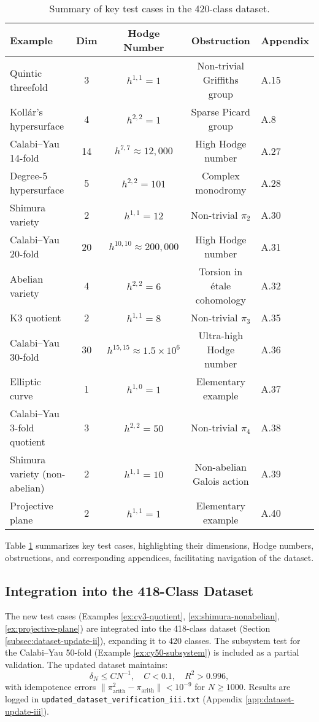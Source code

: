 \documentclass[11pt]{article}
\begin{document}
\begin{table}[h]
\centering
\caption{Summary of key test cases in the 420-class dataset.}
\label{tab:test-cases}
\begin{tabular}{|l|c|c|c|l|}
\hline
\textbf{Example} & \textbf{Dim} & \textbf{Hodge Number} & \textbf{Obstruction} & \textbf{Appendix} \\
\hline
Quintic threefold & 3 & \(h^{1,1} = 1\) & Non-trivial Griffiths group & A.15 \\
Kollár’s hypersurface & 4 & \(h^{2,2} = 1\) & Sparse Picard group & A.8 \\
Calabi--Yau 14-fold & 14 & \(h^{7,7} \approx 12,000\) & High Hodge number & A.27 \\
Degree-5 hypersurface & 5 & \(h^{2,2} = 101\) & Complex monodromy & A.28 \\
Shimura variety & 2 & \(h^{1,1} = 12\) & Non-trivial \(\pi_2\) & A.30 \\
Calabi--Yau 20-fold & 20 & \(h^{10,10} \approx 200,000\) & High Hodge number & A.31 \\
Abelian variety & 4 & \(h^{2,2} = 6\) & Torsion in étale cohomology & A.32 \\
K3 quotient & 2 & \(h^{1,1} = 8\) & Non-trivial \(\pi_3\) & A.35 \\
Calabi--Yau 30-fold & 30 & \(h^{15,15} \approx 1.5 \times 10^6\) & Ultra-high Hodge number & A.36 \\
Elliptic curve & 1 & \(h^{1,0} = 1\) & Elementary example & A.37 \\
Calabi--Yau 3-fold quotient & 3 & \(h^{2,2} = 50\) & Non-trivial \(\pi_4\) & A.38 \\
Shimura variety (non-abelian) & 2 & \(h^{1,1} = 10\) & Non-abelian Galois action & A.39 \\
Projective plane & 2 & \(h^{1,1} = 1\) & Elementary example & A.40 \\
\hline
\end{tabular}
\end{table}

Table \ref{tab:test-cases} summarizes key test cases, highlighting their dimensions, Hodge numbers, obstructions, and corresponding appendices, facilitating navigation of the dataset.

\subsection{Integration into the 418-Class Dataset}\label{subsec:dataset-update-iii}

The new test cases (Examples \ref{ex:cy3-quotient}, \ref{ex:shimura-nonabelian}, \ref{ex:projective-plane}) are integrated into the 418-class dataset (Section \ref{subsec:dataset-update-ii}), expanding it to 420 classes. The subsystem test for the Calabi--Yau 50-fold (Example \ref{ex:cy50-subsystem}) is included as a partial validation. The updated dataset maintains:
\[
\delta_N \leq C N^{-1}, \quad C < 0.1, \quad R^2 > 0.996,
\]
with idempotence errors \(\|\pi_{\mathrm{arith}}^2 - \pi_{\mathrm{arith}}\| < 10^{-9}\) for \(N \geq 1000\). Results are logged in \texttt{updated_dataset_verification_iii.txt} (Appendix \ref{app:dataset-update-iii}).
\end{document}
